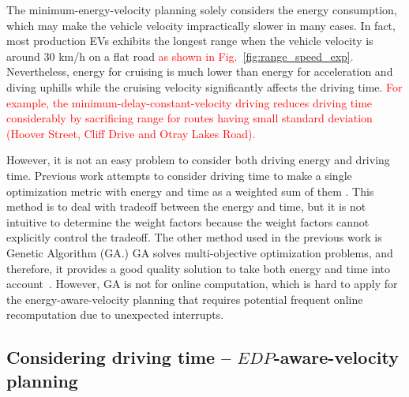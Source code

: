 \documentclass{IEEEtran}
\begin{document}
The minimum-energy-velocity planning solely considers the energy consumption, which may make the vehicle velocity impractically slower in many cases. 
In fact, most production EVs exhibits the longest range when the vehicle velocity is around 30 km/h on a flat road \textcolor{red}{as shown in Fig.~\ref{fig:range_speed_exp}.} Nevertheless, energy for cruising is much lower than energy for acceleration and diving uphills while the cruising velocity significantly affects the driving time. \textcolor{red}{For example, the minimum-delay-constant-velocity driving reduces driving time considerably by sacrificing range for routes having small standard deviation (Hoover Street, Cliff Drive and Otray Lakes Road).}

However, it is not an easy problem to consider both driving energy and driving time. Previous work attempts to consider driving time to make a single optimization metric with energy and time as a weighted sum of them \cite{Lin:ICCA14,Mensing:TR13,Dib:IVPPC11}. This method is to deal with tradeoff between the energy and time, but it is not intuitive to determine the weight factors because the weight factors cannot explicitly control the tradeoff.
The other method used in the previous work is Genetic Algorithm (GA.) GA solves multi-objective optimization problems, and therefore, it provides a good quality solution to take both energy and time into account~\cite{Dovgana:ASC14,Grossard:ISIE12}. However, GA is not for online computation, which is hard to apply for the energy-aware-velocity planning that requires potential frequent online recomputation due to unexpected interrupts. 


\subsection{Considering driving time -- $EDP$-aware-velocity planning} \label{sec:ed_consideration}

\end{document}
